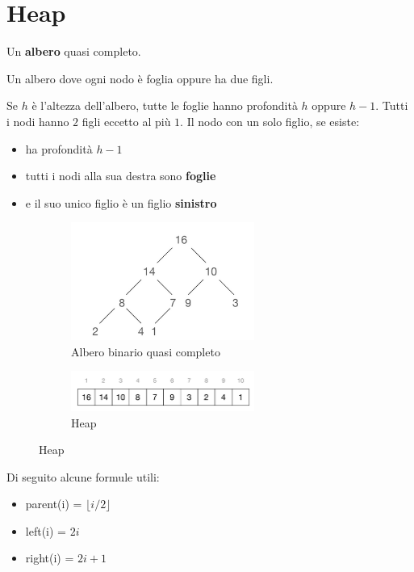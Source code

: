 \newpage
\section{Heap}
\begin{definition}
	Un \textbf{albero} quasi completo.
\end{definition}
\begin{definition}
	Un albero dove ogni nodo è foglia oppure ha due figli.
\end{definition}
\begin{definition}
	Se $h$ è l'altezza dell'albero, tutte le foglie hanno profondità $h$ oppure $h-1$. Tutti i nodi hanno $2$ figli eccetto al più $1$. Il nodo con un solo figlio, se esiste:
	\begin{itemize}
		\item ha profondità $h-1$
		\item tutti i nodi alla sua destra sono \textbf{foglie}
		\item e il suo unico figlio è un figlio \textbf{sinistro}
	\end{itemize}
\end{definition}

\begin{figure}[h]
	\begin{subfigure}{.5\textwidth}
		\centering
		\includegraphics[width=6cm]{images/heap_tree.png}
		\caption{Albero binario quasi completo}
	\end{subfigure}
	\begin{subfigure}{.5\textwidth}
		\centering
		\includegraphics[width=6cm]{images/heap_array.png}
		\caption{Heap}
	\end{subfigure}
\end{figure}

\noindent
Di seguito alcune formule utili:
\begin{itemize}
	\item parent(i) = $\lfloor i/2 \rfloor$
	\item left(i) = $2i$
	\item right(i) = $2i+1$
\end{itemize}

